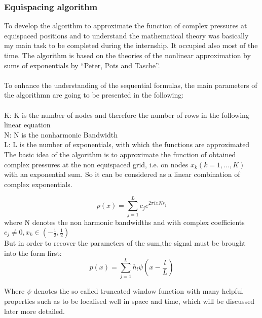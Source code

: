 \documentclass{article}
\begin{document}
\subsubsection{Equispacing algorithm}
To develop the algorithm to approximate the function of complex pressures at equispaced positions and to understand the mathematical theory was basically my main task to be completed during the internship. It occupied also most of the time. The algorithm is based on the theories of the nonlinear approximation by sums of exponentials  by “Peter, Pots and Tasche”. \\\\
To enhance the understanding of the sequential formulas, the main parameters of the algorithmn are going to be presented in the following:\\\\
 K: K is the number of nodes and therefore the number of rows in the following linear equation\\
 N: N is the nonharmonic Bandwidth\\
 L: L is the number of exponentials, with which the functions are approximated\\

The basic idea of the algorithm is to approximate the function of obtained complex pressures at the non equispaced grid, i.e. on nodes $x_{k}(k=1,...,K)$ with an exponential sum. So it can be considered as a linear combination of complex exponentials.

\begin{equation}
 p(x)=\sum\limits_{j=1}^L c_{j}e^{2πixNs_{j}}
\end{equation}
where N denotes the non harmonic bandwidths and with complex coefficients $c_{j}\neq0, x_{k} \in (-\frac{1}{2},\frac{1}{2})$
\\

But in order to recover the parameters of the sum,the signal must be brought into the form first:  
\begin{equation}\label{eqn:truncatedw}
 p(x)=\sum\limits_{j=1}^L h_{l}\psi(x-\frac{l}{L})
\end{equation}

Where $\psi$ denotes the so called truncated window function with many helpful properties such as to be localised well in space and time, which will be discussed later more detailed. \\
\end{document}

